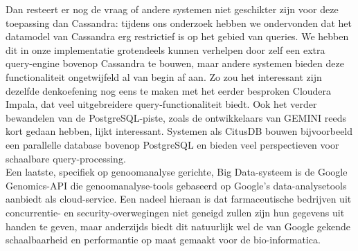 Dan resteert er nog de vraag of andere systemen niet geschikter zijn voor deze toepassing dan Cassandra: tijdens ons onderzoek hebben we ondervonden dat het datamodel van Cassandra erg restrictief is op het gebied van queries. We hebben dit in onze implementatie grotendeels kunnen verhelpen door zelf een extra query-engine bovenop Cassandra te bouwen, maar andere systemen bieden deze functionaliteit ongetwijfeld al van begin af aan. Zo zou het interessant zijn dezelfde denkoefening nog eens te maken met het eerder besproken Cloudera Impala, dat veel uitgebreidere query-functionaliteit biedt. Ook het verder bewandelen van de PostgreSQL-piste, zoals de ontwikkelaars van GEMINI reeds kort gedaan hebben, lijkt interessant. Systemen als CitusDB \cite{citus_db} bouwen bijvoorbeeld een parallelle database bovenop PostgreSQL en bieden veel perspectieven voor schaalbare query-processing.
\\Een laatste, specifiek op genoomanalyse gerichte, Big Data-systeem is de Google Genomics-API\cite{google_genomics} die genoomanalyse-tools gebaseerd op Google's data-analysetools aanbiedt als cloud-service. Een nadeel hieraan is dat farmaceutische bedrijven uit concurrentie- en security-overwegingen niet geneigd zullen zijn hun gegevens uit handen te geven, maar anderzijds biedt dit natuurlijk wel de van Google gekende schaalbaarheid en performantie op maat gemaakt voor de bio-informatica.